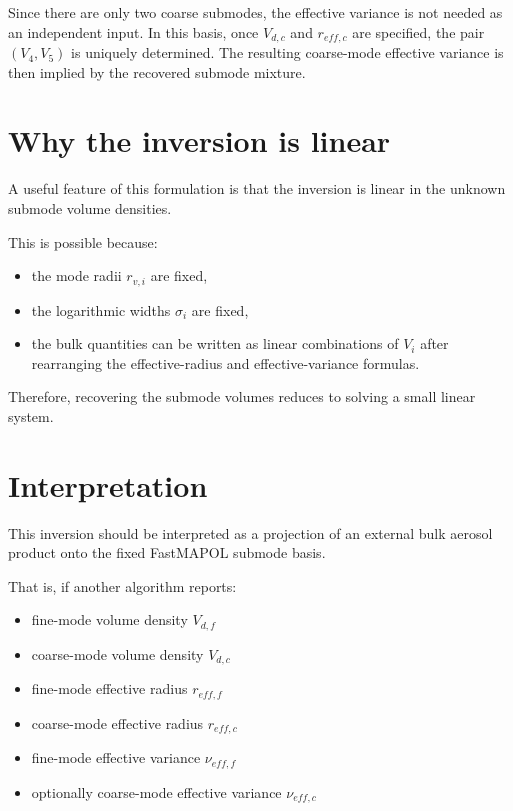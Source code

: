\documentclass[
  letterpaper,
]{scrbook}
\providecommand{\tightlist}{%
  \setlength{\itemsep}{0pt}\setlength{\parskip}{0pt}}
\begin{document}
Since there are only two coarse submodes, the effective variance is not
needed as an independent input. In this basis, once \(V_{d,c}\) and
\(r_{eff,c}\) are specified, the pair \((V_4,V_5)\) is uniquely
determined. The resulting coarse-mode effective variance is then implied
by the recovered submode mixture.

\section{Why the inversion is linear}\label{why-the-inversion-is-linear}

A useful feature of this formulation is that the inversion is linear in
the unknown submode volume densities.

This is possible because:

\begin{itemize}
\tightlist
\item
  the mode radii \(r_{v,i}\) are fixed,
\item
  the logarithmic widths \(\sigma_i\) are fixed,
\item
  the bulk quantities can be written as linear combinations of \(V_i\)
  after rearranging the effective-radius and effective-variance
  formulas.
\end{itemize}

Therefore, recovering the submode volumes reduces to solving a small
linear system.

\section{Interpretation}\label{interpretation-2}

This inversion should be interpreted as a projection of an external bulk
aerosol product onto the fixed FastMAPOL submode basis.

That is, if another algorithm reports:

\begin{itemize}
\tightlist
\item
  fine-mode volume density \(V_{d,f}\)
\item
  coarse-mode volume density \(V_{d,c}\)
\item
  fine-mode effective radius \(r_{eff,f}\)
\item
  coarse-mode effective radius \(r_{eff,c}\)
\item
  fine-mode effective variance \(\nu_{eff,f}\)
\item
  optionally coarse-mode effective variance \(\nu_{eff,c}\)
\end{itemize}
\end{document}
